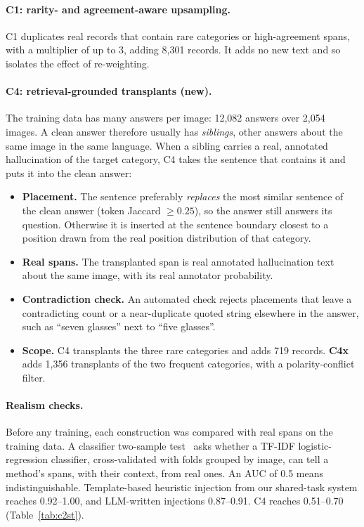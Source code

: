 \paragraph{C1: rarity- and agreement-aware upsampling.}
C1 duplicates real records that contain rare categories or high-agreement spans, with a multiplier of up to 3, adding 8,301 records. It adds no new text and so isolates the effect of re-weighting.

\paragraph{C4: retrieval-grounded transplants (new).}
The training data has many answers per image: 12,082 answers over 2,054 images. A clean answer therefore usually has \emph{siblings}, other answers about the same image in the same language. When a sibling carries a real, annotated hallucination of the target category, C4 takes the sentence that contains it and puts it into the clean answer:
\begin{itemize}
    \item \textbf{Placement.} The sentence preferably \emph{replaces} the most similar sentence of the clean answer (token Jaccard $\ge 0.25$), so the answer still answers its question. Otherwise it is inserted at the sentence boundary closest to a position drawn from the real position distribution of that category.
    \item \textbf{Real spans.} The transplanted span is real annotated hallucination text about the same image, with its real annotator probability.
    \item \textbf{Contradiction check.} An automated check rejects placements that leave a contradicting count or a near-duplicate quoted string elsewhere in the answer, such as ``seven glasses'' next to ``five glasses''.
    \item \textbf{Scope.} C4 transplants the three rare categories and adds 719 records. \textbf{C4x} adds 1,356 transplants of the two frequent categories, with a polarity-conflict filter.
\end{itemize}

\paragraph{Realism checks.}
Before any training, each construction was compared with real spans on the training data. A classifier two-sample test~\cite{lopezpaz2017c2st} asks whether a TF-IDF logistic-regression classifier, cross-validated with folds grouped by image, can tell a method's spans, with their context, from real ones. An AUC of 0.5 means indistinguishable. Template-based heuristic injection from our shared-task system reaches 0.92--1.00, and LLM-written injections 0.87--0.91. C4 reaches 0.51--0.70 (Table~\ref{tab:c2st}).

